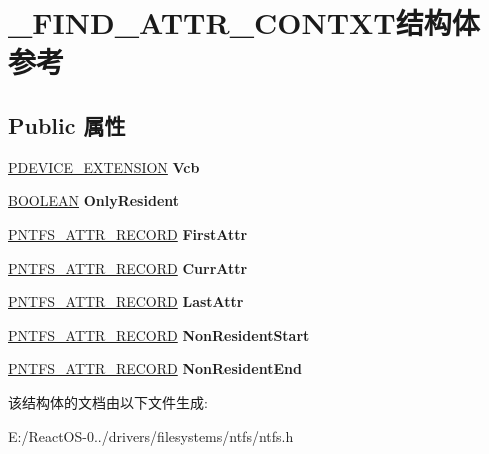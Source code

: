 \hypertarget{struct___f_i_n_d___a_t_t_r___c_o_n_t_x_t}{}\section{\+\_\+\+F\+I\+N\+D\+\_\+\+A\+T\+T\+R\+\_\+\+C\+O\+N\+T\+X\+T结构体 参考}
\label{struct___f_i_n_d___a_t_t_r___c_o_n_t_x_t}
\subsection*{Public 属性}
\begin{DoxyCompactItemize}
\item 
\mbox{\label{struct___f_i_n_d___a_t_t_r___c_o_n_t_x_t_a7024375175d64fbdcf39ca9822a0022d}} 
\hyperlink{struct___b_e_e_p___d_e_v_i_c_e___e_x_t_e_n_s_i_o_n}{P\+D\+E\+V\+I\+C\+E\+\_\+\+E\+X\+T\+E\+N\+S\+I\+ON} {\bfseries Vcb}
\item 
\mbox{\label{struct___f_i_n_d___a_t_t_r___c_o_n_t_x_t_ae33fae284c317cc0b32597cfc7a8d781}} 
\hyperlink{_processor_bind_8h_a112e3146cb38b6ee95e64d85842e380a}{B\+O\+O\+L\+E\+AN} {\bfseries Only\+Resident}
\item 
\mbox{\label{struct___f_i_n_d___a_t_t_r___c_o_n_t_x_t_a505b58e5019e7dd2f796dccdd96d6237}} 
\hyperlink{struct_n_t_f_s___a_t_t_r___r_e_c_o_r_d}{P\+N\+T\+F\+S\+\_\+\+A\+T\+T\+R\+\_\+\+R\+E\+C\+O\+RD} {\bfseries First\+Attr}
\item 
\mbox{\label{struct___f_i_n_d___a_t_t_r___c_o_n_t_x_t_add6f12254ce94a97d0aad21827072518}} 
\hyperlink{struct_n_t_f_s___a_t_t_r___r_e_c_o_r_d}{P\+N\+T\+F\+S\+\_\+\+A\+T\+T\+R\+\_\+\+R\+E\+C\+O\+RD} {\bfseries Curr\+Attr}
\item 
\mbox{\label{struct___f_i_n_d___a_t_t_r___c_o_n_t_x_t_ab746d38e69d2f270b068c24ed423a2c5}} 
\hyperlink{struct_n_t_f_s___a_t_t_r___r_e_c_o_r_d}{P\+N\+T\+F\+S\+\_\+\+A\+T\+T\+R\+\_\+\+R\+E\+C\+O\+RD} {\bfseries Last\+Attr}
\item 
\mbox{\label{struct___f_i_n_d___a_t_t_r___c_o_n_t_x_t_a8a42a57033b777806f6664fbe65847e9}} 
\hyperlink{struct_n_t_f_s___a_t_t_r___r_e_c_o_r_d}{P\+N\+T\+F\+S\+\_\+\+A\+T\+T\+R\+\_\+\+R\+E\+C\+O\+RD} {\bfseries Non\+Resident\+Start}
\item 
\mbox{\label{struct___f_i_n_d___a_t_t_r___c_o_n_t_x_t_a1fa3763cea74c32f5a09eb4b8f085e2a}} 
\hyperlink{struct_n_t_f_s___a_t_t_r___r_e_c_o_r_d}{P\+N\+T\+F\+S\+\_\+\+A\+T\+T\+R\+\_\+\+R\+E\+C\+O\+RD} {\bfseries Non\+Resident\+End}
\end{DoxyCompactItemize}


该结构体的文档由以下文件生成\+:\begin{DoxyCompactItemize}
\item 
E\+:/\+React\+O\+S-\/0../drivers/filesystems/ntfs/ntfs.\+h\end{DoxyCompactItemize}

